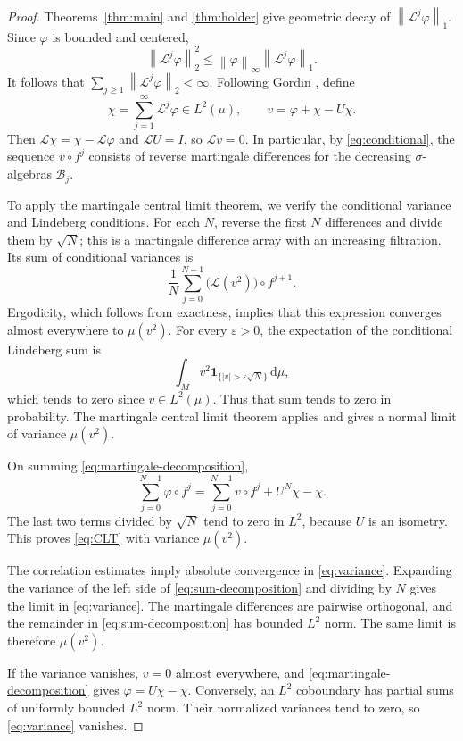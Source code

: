 \documentclass[10pt,a4paper]{amsart}
\newcommand{\Lop}{\mathcal L}
\newcommand{\Bcal}{\mathcal B}
\newcommand{\norm}[1]{\left\lVert #1\right\rVert}
\newcommand{\dd}{\mathrm d}
\numberwithin{equation}{section}
\begin{document}
\begin{proof}
Theorems~\ref{thm:main} and \ref{thm:holder} give geometric decay of $\norm{\Lop^j\varphi}_1$. Since $\varphi$ is bounded and centered,
\[
 \norm{\Lop^j\varphi}_2^2
 \le\norm{\varphi}_\infty\norm{\Lop^j\varphi}_1.
\]
It follows that $\sum_{j\ge1}\norm{\Lop^j\varphi}_2<\infty$. Following Gordin \cite{Gordin69}, define
\begin{equation}\label{eq:martingale-decomposition}
 \chi=\sum_{j=1}^{\infty}\Lop^j\varphi\in L^2(\mu),
 \qquad v=\varphi+\chi-U\chi.
\end{equation}
Then $\Lop\chi=\chi-\Lop\varphi$ and $\Lop U=I$, so $\Lop v=0$. In particular, by \eqref{eq:conditional}, the sequence $v\circ f^j$ consists of reverse martingale differences for the decreasing $\sigma$-algebras $\Bcal_j$.

To apply the martingale central limit theorem, we verify the conditional variance and Lindeberg conditions. For each $N$, reverse the first $N$ differences and divide them by $\sqrt N$; this is a martingale difference array with an increasing filtration. Its sum of conditional variances is
\[
 \frac1N\sum_{j=0}^{N-1}\big(\Lop(v^2)\big)\circ f^{j+1}.
\]
Ergodicity, which follows from exactness, implies that this expression converges almost everywhere to $\mu(v^2)$. For every $\varepsilon>0$, the expectation of the conditional Lindeberg sum is
\[
 \int_M v^2\mathbf1_{\{|v|>\varepsilon\sqrt N\}}\,\dd\mu,
\]
which tends to zero since $v\in L^2(\mu)$. Thus that sum tends to zero in probability. The martingale central limit theorem \cite{Brown71} applies and gives a normal limit of variance $\mu(v^2)$.

On summing \eqref{eq:martingale-decomposition},
\begin{equation}\label{eq:sum-decomposition}
 \sum_{j=0}^{N-1}\varphi\circ f^j
 =\sum_{j=0}^{N-1}v\circ f^j+U^N\chi-\chi.
\end{equation}
The last two terms divided by $\sqrt N$ tend to zero in $L^2$, because $U$ is an isometry. This proves \eqref{eq:CLT} with variance $\mu(v^2)$.

The correlation estimates imply absolute convergence in \eqref{eq:variance}. Expanding the variance of the left side of \eqref{eq:sum-decomposition} and dividing by $N$ gives the limit in \eqref{eq:variance}. The martingale differences are pairwise orthogonal, and the remainder in \eqref{eq:sum-decomposition} has bounded $L^2$ norm. The same limit is therefore $\mu(v^2)$.

If the variance vanishes, $v=0$ almost everywhere, and \eqref{eq:martingale-decomposition} gives $\varphi=U\chi-\chi$. Conversely, an $L^2$ coboundary has partial sums of uniformly bounded $L^2$ norm. Their normalized variances tend to zero, so \eqref{eq:variance} vanishes.
\end{proof}
\end{document}
